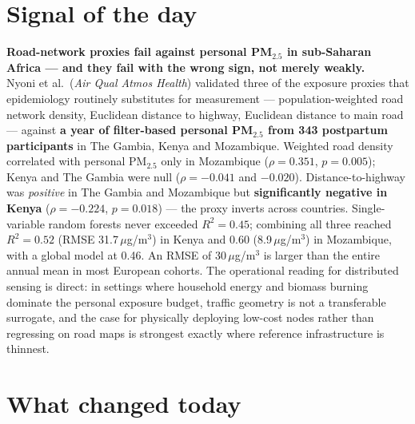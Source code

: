 \documentclass[10pt]{article}
\begin{document}
\vspace{6mm}

\section*{\sffamily\bfseries\color{Deep}Signal of the day}
\vspace{-1.5mm}{\color{Amber}\rule{\linewidth}{1.1pt}}\vspace{2.5mm}

\begin{keybox}
{\sffamily\bfseries\small\color{Deep}Road-network proxies fail against personal PM$_{2.5}$
in sub-Saharan Africa --- and they fail with the wrong sign, not merely weakly.}\\[1.4mm]
\footnotesize
Nyoni et al.\ (\textit{Air Qual Atmos Health}) validated three of the exposure proxies
that epidemiology routinely substitutes for measurement --- population-weighted road
network density, Euclidean distance to highway, Euclidean distance to main road ---
against \textbf{a year of filter-based personal PM$_{2.5}$ from 343 postpartum
participants} in The Gambia, Kenya and Mozambique. Weighted road density correlated with
personal PM$_{2.5}$ only in Mozambique ($\rho = 0.351$, $p = 0.005$); Kenya and The Gambia
were null ($\rho = -0.041$ and $-0.020$). Distance-to-highway was \emph{positive} in
The Gambia and Mozambique but \textbf{significantly negative in Kenya}
($\rho = -0.224$, $p = 0.018$) --- the proxy inverts across countries. Single-variable
random forests never exceeded $R^2 = 0.45$; combining all three reached
$R^2 = 0.52$ (RMSE 31.7\,$\mu$g/m$^3$) in Kenya and 0.60 (8.9\,$\mu$g/m$^3$) in
Mozambique, with a global model at 0.46. An RMSE of 30\,$\mu$g/m$^3$ is larger than the
entire annual mean in most European cohorts. The operational reading for
distributed sensing is direct: in settings where household energy and biomass burning
dominate the personal exposure budget, traffic geometry is not a transferable
surrogate, and the case for physically deploying low-cost nodes rather than
regressing on road maps is strongest exactly where reference infrastructure is
thinnest.
\end{keybox}

\vspace{3mm}

\section*{\sffamily\bfseries\color{Deep}What changed today}
\vspace{-1.5mm}{\color{Amber}\rule{\linewidth}{1.1pt}}\vspace{2.5mm}
\end{document}
